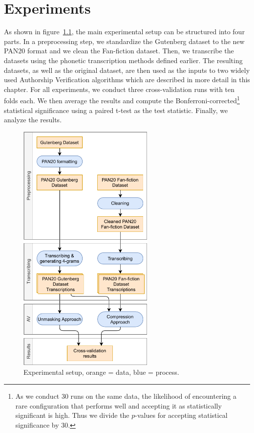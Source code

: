 \chapter{Experiments}\label{experiments}
As shown in figure~\ref{fig:process}, the main experimental setup can be structured into four parts.
In a preprocessing step, we standardize the Gutenberg dataset to the new PAN20 format and we clean the Fan-fiction dataset.
Then, we transcribe the datasets using the phonetic transcription methods defined earlier.
The resulting datasets, as well as the original dataset, are then used as the inputs to two widely used Authorship Verification algorithms which are described in more detail in this chapter.
For all experiments, we conduct three cross-validation runs with ten folds each.
We then average the results and compute the Bonferroni-corrected\footnote{As we conduct 30 runs on the same data, the likelihood of encountering a rare configuration that performs well and accepting it as statistically significant is high. Thus we divide the $p$-values for accepting statistical significance by 30.} statistical significance using a paired t-test as the test statistic.
Finally, we analyze the results.
\begin{figure}
  \centering
  \includegraphics[width=0.6\textwidth]{figures/process}
  \caption{Experimental setup, orange = data, blue = process.}
  \label{fig:process}
\end{figure}

